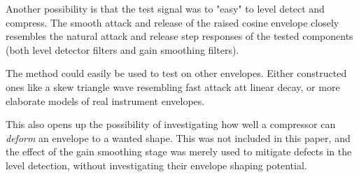 \documentclass[../main2.tex]{subfiles}
\begin{document}
Another possibility is that the test signal was to "easy" to level detect and compress. The smooth attack and release of the raised cosine envelope closely resembles the natural attack and release step responses of the tested components (both level detector filters and gain smoothing filters).

The method could easily be used to test on other envelopes. Either constructed ones like a skew triangle wave resembling fast attack att linear decay, or more elaborate models of real instrument envelopes.

This also opens up the possibility of investigating how well a compressor can \emph{deform} an envelope to a wanted shape. This was not included in this paper, and the effect of the gain smoothing stage was merely used to mitigate defects in the level detection, without investigating their envelope shaping potential. 
\end{document}

